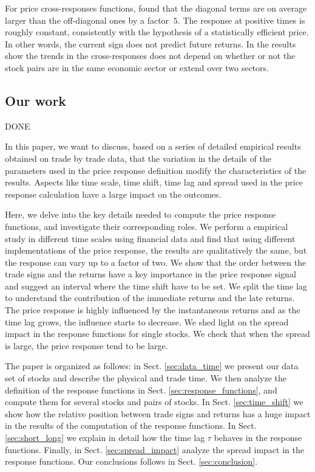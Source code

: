For price cross-responses functions, \cite{dissecting_cross} found that the
diagonal terms are on average larger than the off-diagonal ones by a factor
$~5$. The response at positive times is roughly constant, consistently with the
hypothesis of a statistically efficient price. In other words, the current sign
does not predict future returns. In \cite{Wang_2016_cross} the results show the
trends in the cross-responses does not depend on whether or not the stock pairs
are in the same economic sector or extend over two sectors.

\subsection{Our work} DONE

In this paper, we want to discuss, based on a series of detailed empirical
results obtained on trade by trade data, that the variation in the details of
the parameters used in the price response definition modify the characteristics
of the results. Aspects like time scale, time shift, time lag and spread used
in the price response calculation have a large impact on the outcomes.

Here, we delve into the key details needed to compute the price response
functions, and investigate their corresponding roles. We perform a empirical
study in different time scales using financial data and find that using
different implementations of the price response, the results are qualitatively
the same, but the response can vary up to a factor of two. We show that the
order between the trade signs and the returns have a key importance in the
price response signal and suggest an interval where the time shift have to be
set. We split the time lag to understand the contribution of the immediate
returns and the late returns. The price response is highly influenced by the
instantaneous returns and as the time lag grows, the influence starts to
decrease. We shed light on the spread impact in the response functions for
single stocks. We check that when the spread is large, the price response tend
to be large.

The paper is organized as follows: in Sect. \ref{sec:data_time} we present our
data set of stocks and describe the physical and trade time. We then
analyze the definition of the response functions in Sect.
\ref{sec:response_functions}, and compute them for several stocks and pairs of
stocks. In Sect. \ref{sec:time_shift} we show how the relative position between
trade signs and returns has a huge impact in the results of the computation of
the response functions. In Sect. \ref{sec:short_long} we explain in detail how
the time lag $\tau$ behaves in the response functions. Finally, in Sect.
\ref{sec:spread_impact} analyze the spread impact in the response functions.
 Our conclusions follows in Sect. \ref{sec:conclusion}.